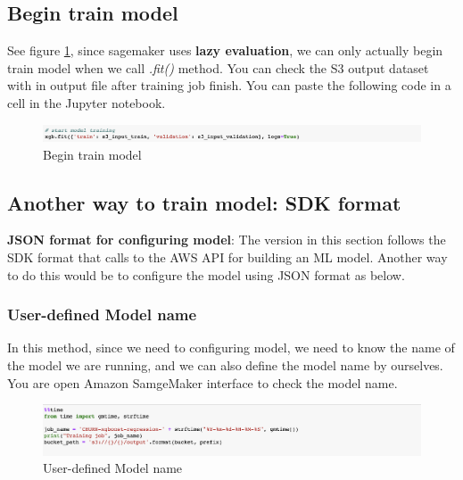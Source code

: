 \documentclass[12pt]{article}
\begin{document}
\subsection{Begin train model}
See figure \ref{fig:model_train}, since sagemaker uses \textbf{lazy evaluation}, we can only actually begin train model when we call \textit{.fit()} method. You can check the S3 output dataset with in output file after training job finish. You can paste the following code in a cell in the Jupyter notebook.
\begin{figure}[H]
\centering
\begin{minipage}{1\textwidth}
  \centering
  \includegraphics[width=1\linewidth]{model_train.png}
   \caption{Begin train model}
   \label{fig:model_train}
\end{minipage}%
\end{figure}
\noindent


\subsection{Another way to train model: SDK format}
\textbf{JSON format for configuring model}: The version in this section follows the SDK format that calls to the AWS API for building an ML model. Another way to do this would be to configure the model using JSON format as below.

\subsubsection{User-defined Model name}
In this method, since we need to configuring model, we need to know the name of the model we are running, and we can also define the model name by ourselves. You are open Amazon SamgeMaker interface to check the model name. 
\begin{figure}[H]
\centering
\begin{minipage}{1\textwidth}
  \centering
  \includegraphics[width=1\linewidth]{UDModel_name.png}
   \caption{User-defined Model name}
   \label{fig:UDModel_name}
\end{minipage}%
\end{figure}
\noindent
\end{document}
